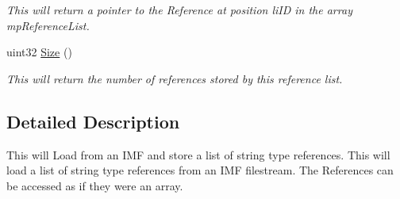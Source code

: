 \begin{DoxyCompactItemize}
\begin{DoxyCompactList}\small\item\em This will return a pointer to the Reference at position liID in the array mpReferenceList. \end{DoxyCompactList}\item 
\hypertarget{classc_reference_list_a62594e7b164aa1f430a928cd9af655e3}{
uint32 \hyperlink{classc_reference_list_a62594e7b164aa1f430a928cd9af655e3}{Size} ()}
\label{classc_reference_list_a62594e7b164aa1f430a928cd9af655e3}

\begin{DoxyCompactList}\small\item\em This will return the number of references stored by this reference list. \end{DoxyCompactList}\end{DoxyCompactItemize}


\subsection{Detailed Description}
This will Load from an IMF and store a list of string type references. This will load a list of string type references from an IMF filestream. The References can be accessed as if they were an array. 